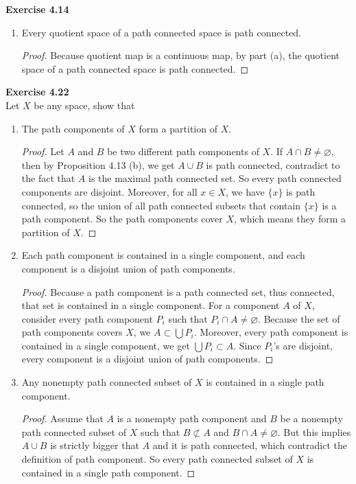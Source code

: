 \documentclass[12pt, a4paper]{article}
\theoremstyle{plain}
\newenvironment{exercise}[2][Exercise]
    { \begin{mdframed}[backgroundcolor=gray!20] \textbf{#1 #2} \\}
    {  \end{mdframed}}
\begin{document}
\begin{exercise}{4.14}
\begin{enumerate}[label=(\alph*)]
\begin{proof}
	\end{proof}
\item Every quotient space of a path connected space is path connected.
	\begin{proof}
	Because quotient map is a continuous map, by part (a), the quotient space of a path connected space is path connected.
	\end{proof}

\end{enumerate}
\end{exercise}

\begin{exercise}{4.22}
Let $X$ be any space, show that
\begin{enumerate}[label=(\alph*)]
\item The path components of $X$ form a partition of $X$.
	\begin{proof}
	Let $A$ and $B$ be two different path components of $X$. If $A\cap B\neq \varnothing$, then by Proposition 4.13 (b), we get $A\cup B$ is path connected, contradict to the fact that $A$ is the maximal path connected set. So every path connected components are disjoint. Moreover, for all $x\in X$, we have $\{x\}$ is path connected, so the union of all path connected subsets that contain $\{x\}$ is a path component. So the path components cover $X$, which means they form a partition of $X$.
	\end{proof}
\item Each path component is contained in a single component, and each component is a disjoint union of path components.
	\begin{proof}
	Because a path component is a path connected set, thus connected, that set is contained in a single component. For a component $A$ of $X$, consider every path component $P_i$ such that $P_i\cap A\neq \varnothing$. Because the set of path components covers $X$, we $A\subset \bigcup P_i$. Moreover, every path component is contained in a single component, we get $\bigcup P_i\subset A$. Since $P_i$'s are disjoint, every component is a disjoint union of path components.
	\end{proof}
\item Any nonempty path connected subset of $X$ is contained in a single path component.
	\begin{proof}
	Assume that $A$ is a nonempty path component and $B$ be a nonempty path connected subset of $X$ such that $B\not\subset A$ and $B\cap A\neq \varnothing$. But this implies $A\cup B$ is strictly bigger that $A$ and it is path connected, which contradict the definition of path component. So every path connected subset of $X$ is contained in a single path component.
	\end{proof}
\end{enumerate}
\end{exercise}
\end{document}
